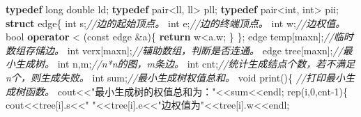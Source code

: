 \documentclass[
]{article}
\newenvironment{Shaded}{}{}
\newcommand{\AttributeTok}[1]{\textcolor[rgb]{0.49,0.56,0.16}{#1}}
\newcommand{\CommentTok}[1]{\textcolor[rgb]{0.38,0.63,0.69}{\textit{#1}}}
\newcommand{\ControlFlowTok}[1]{\textcolor[rgb]{0.00,0.44,0.13}{\textbf{#1}}}
\newcommand{\DataTypeTok}[1]{\textcolor[rgb]{0.56,0.13,0.00}{#1}}
\newcommand{\DecValTok}[1]{\textcolor[rgb]{0.25,0.63,0.44}{#1}}
\newcommand{\KeywordTok}[1]{\textcolor[rgb]{0.00,0.44,0.13}{\textbf{#1}}}
\newcommand{\NormalTok}[1]{#1}
\newcommand{\OperatorTok}[1]{\textcolor[rgb]{0.40,0.40,0.40}{#1}}
\newcommand{\StringTok}[1]{\textcolor[rgb]{0.25,0.44,0.63}{#1}}
\begin{document}
\begin{Shaded}
\begin{Highlighting}[]
\KeywordTok{typedef} \DataTypeTok{long} \DataTypeTok{double}\NormalTok{ ld}\OperatorTok{;}
\KeywordTok{typedef}\NormalTok{ pair}\OperatorTok{\textless{}}\NormalTok{ll}\OperatorTok{,}\NormalTok{ ll}\OperatorTok{\textgreater{}}\NormalTok{  pll}\OperatorTok{;}
\KeywordTok{typedef}\NormalTok{ pair}\OperatorTok{\textless{}}\DataTypeTok{int}\OperatorTok{,} \DataTypeTok{int}\OperatorTok{\textgreater{}}\NormalTok{ pii}\OperatorTok{;}
\KeywordTok{struct}\NormalTok{ edge}\OperatorTok{\{}
	\DataTypeTok{int}\NormalTok{ s}\OperatorTok{;}\CommentTok{//边的起始顶点。}
	\DataTypeTok{int}\NormalTok{ e}\OperatorTok{;}\CommentTok{//边的终端顶点。}
	\DataTypeTok{int}\NormalTok{ w}\OperatorTok{;}\CommentTok{//边权值。}
	\DataTypeTok{bool} \KeywordTok{operator} \OperatorTok{\textless{}} \OperatorTok{(}\AttributeTok{const}\NormalTok{ edge }\OperatorTok{\&}\NormalTok{a}\OperatorTok{)\{}
		\ControlFlowTok{return}\NormalTok{ w}\OperatorTok{\textless{}}\NormalTok{a}\OperatorTok{.}\NormalTok{w}\OperatorTok{;}
	\OperatorTok{\}}
\OperatorTok{\};}
\NormalTok{edge temp}\OperatorTok{[}\NormalTok{maxn}\OperatorTok{];}\CommentTok{//临时数组存储边。}
\DataTypeTok{int}\NormalTok{ verx}\OperatorTok{[}\NormalTok{maxn}\OperatorTok{];}\CommentTok{//辅助数组，判断是否连通。}
\NormalTok{edge tree}\OperatorTok{[}\NormalTok{maxn}\OperatorTok{];}\CommentTok{//最小生成树。}
\DataTypeTok{int}\NormalTok{ n}\OperatorTok{,}\NormalTok{m}\OperatorTok{;}\CommentTok{//n*n的图，m条边。}
\DataTypeTok{int}\NormalTok{ cnt}\OperatorTok{;}\CommentTok{//统计生成结点个数，若不满足n个，则生成失败。}
\DataTypeTok{int}\NormalTok{ sum}\OperatorTok{;}\CommentTok{//最小生成树权值总和。}
\DataTypeTok{void}\NormalTok{ print}\OperatorTok{()\{}
	\CommentTok{//打印最小生成树函数。}
\NormalTok{	cout}\OperatorTok{\textless{}\textless{}}\StringTok{"最小生成树的权值总和为："}\OperatorTok{\textless{}\textless{}}\NormalTok{sum}\OperatorTok{\textless{}\textless{}}\NormalTok{endl}\OperatorTok{;}
\NormalTok{	rep}\OperatorTok{(}\NormalTok{i}\OperatorTok{,}\DecValTok{0}\OperatorTok{,}\NormalTok{cnt}\OperatorTok{{-}}\DecValTok{1}\OperatorTok{)\{}
\NormalTok{		cout}\OperatorTok{\textless{}\textless{}}\NormalTok{tree}\OperatorTok{[}\NormalTok{i}\OperatorTok{].}\NormalTok{s}\OperatorTok{\textless{}\textless{}}\StringTok{" "}\OperatorTok{\textless{}\textless{}}\NormalTok{tree}\OperatorTok{[}\NormalTok{i}\OperatorTok{].}\NormalTok{e}\OperatorTok{\textless{}\textless{}}\StringTok{"边权值为"}\OperatorTok{\textless{}\textless{}}\NormalTok{tree}\OperatorTok{[}\NormalTok{i}\OperatorTok{].}\NormalTok{w}\OperatorTok{\textless{}\textless{}}\NormalTok{endl}\OperatorTok{;}

\end{Highlighting}
\end{Shaded}
\end{document}
